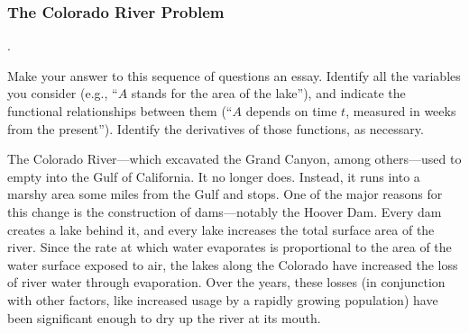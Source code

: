 \subsubsection{The Colorado River Problem}.
\label{subsubsec:the-colorado-river-problem}



Make your answer to this sequence of questions an essay.  Identify all
the variables you consider (e.g., ``$A$ stands for the area of the
lake''), and indicate the functional relationships between them (``$A$
depends on time $t$, measured in weeks from the present'').  Identify
the derivatives of those functions, as necessary.

The Colorado River---which excavated the Grand Canyon, among others---used to empty into the Gulf of California.  It no longer does.  Instead, it runs into a marshy area some miles from the Gulf and stops.  One of the major reasons for this change is the construction of dams---notably the Hoover Dam.  Every dam creates a lake behind it, and every lake increases the total surface area of the river.  Since the rate at which water evaporates is proportional to the area of the water surface exposed to air, the lakes along the Colorado have increased the loss of river water through evaporation.  Over the years, these losses (in conjunction with other factors, like increased usage by a rapidly growing population) have been significant enough to dry up the river at its mouth. 





